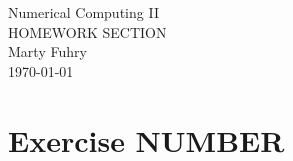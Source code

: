\documentclass[11pt]{article}
\begin{document}
         
\newcommand{\makehomework}[2]%
{\begin{center}%
	\Huge #1\\%
	\Large #2\\%
	Marty Fuhry\\%
	\today%
\end{center}}
\makehomework{Numerical Computing II}{HOMEWORK SECTION}

\section*{Exercise NUMBER}
%


\end{document}
